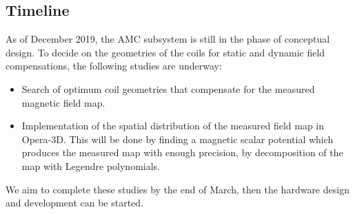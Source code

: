\subsection{Timeline}
As of December 2019, the AMC subsystem is still in the phase of conceptual design. To decide on the geometries of the coils for static and dynamic field compensations, the following studies are underway:
\begin{itemize}
\item Search of optimum coil geometries that compensate for the measured magnetic field map.
\item Implementation of the spatial distribution of the measured field map in Opera-3D. This will be done by finding a magnetic scalar potential which produces the measured map with enough precision, by decomposition of the map with Legendre polynomials. 
\end{itemize}
We aim to complete these studies by the end of March, then the hardware design and development can be started.











